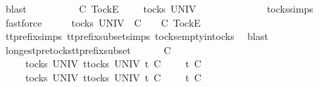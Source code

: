 \ blast\isanewline
{}\isamarkupfalse%
\isanewline
\ \ \isamarkupfalse%
\ {\isasymrho}\ {\isasymsigma}\isanewline
\ \ \isamarkupfalse%
\ {\isachardoublequoteopen}{\isasymrho}\ {\isasymlesssim}\isactrlsub C\ {\isacharbrackleft}Tock{\isacharbrackright}\isactrlsub E\ {\isacharhash}\ {\isasymsigma}{\isachardoublequoteclose}\ {\isachardoublequoteopen}{\isasymrho}\ {\isasymin}\ tocks\ UNIV{\isachardoublequoteclose}\isanewline
\ \ \isamarkupfalse%
\ \isamarkupfalse%
\ {\isachardoublequoteopen}{\isasymrho}\ {\isacharequal}\ {\isacharbrackleft}{\isacharbrackright}{\isachardoublequoteclose}\isanewline
\ \ \ \ \isamarkupfalse%
\ tocks{\isachardot}simps\ \isamarkupfalse%
\ fastforce\isanewline
\ \ \isamarkupfalse%
\ \isamarkupfalse%
\ {\isachardoublequoteopen}{\isasymexists}{\isasymrho}{\isacharprime}{\isasymin}tocks\ UNIV{\isachardot}\ {\isasymrho}\ {\isasymlesssim}\isactrlsub C\ {\isasymrho}{\isacharprime}\ {\isasymand}\ {\isasymrho}{\isacharprime}\ {\isasymle}\isactrlsub C\ {\isacharbrackleft}Tock{\isacharbrackright}\isactrlsub E\ {\isacharhash}\ {\isasymsigma}{\isachardoublequoteclose}\isanewline
\ \ \ \ \isamarkupfalse%
\ tt{\isacharunderscore}prefix{\isachardot}simps{\isacharparenleft}{}{\isacharparenright}\ tt{\isacharunderscore}prefix{\isacharunderscore}subset{\isachardot}simps{\isacharparenleft}{}{\isacharparenright}\ tocks{\isachardot}empty{\isacharunderscore}in{\isacharunderscore}tocks\ \isamarkupfalse%
\ blast\isanewline
{}\isamarkupfalse%
%
\endisatagproof
{\isafoldproof}%
%
\isadelimproof
\isanewline
%
\endisadelimproof
\isanewline
{}\isamarkupfalse%
\ longest{\isacharunderscore}pretocks{\isacharunderscore}tt{\isacharunderscore}prefix{\isacharunderscore}subset{\isacharcolon}\isanewline
\ \ \ {\isachardoublequoteopen}{\isasymrho}{\isacharprime}\ {\isacharat}\ {\isasymsigma}{\isacharprime}\ {\isasymlesssim}\isactrlsub C\ {\isasymrho}\ {\isacharat}\ {\isasymsigma}{\isachardoublequoteclose}\isanewline
\ \ \ {\isachardoublequoteopen}{\isasymrho}\ {\isasymin}\ tocks\ UNIV{\isachardoublequoteclose}\ {\isachardoublequoteopen}{\isasymforall}t{\isasymin}tocks\ UNIV{\isachardot}\ t\ {\isasymle}\isactrlsub C\ {\isasymrho}\ {\isacharat}\ {\isasymsigma}\ {\isasymlongrightarrow}\ t\ {\isasymle}\isactrlsub C\ {\isasymrho}{\isachardoublequoteclose}\isanewline
\ \ \ {\isachardoublequoteopen}{\isasymrho}{\isacharprime}\ {\isasymin}\ tocks\ UNIV{\isachardoublequoteclose}\ {\isachardoublequoteopen}{\isasymforall}t{\isasymin}tocks\ UNIV{\isachardot}\ t\ {\isasymle}\isactrlsub C\ {\isasymrho}{\isacharprime}\ {\isacharat}\ {\isasymsigma}{\isacharprime}\ {\isasymlongrightarrow}\ t\ {\isasymle}\isactrlsub C\ {\isasymrho}{\isacharprime}{\isachardoublequoteclose}\isanewline
